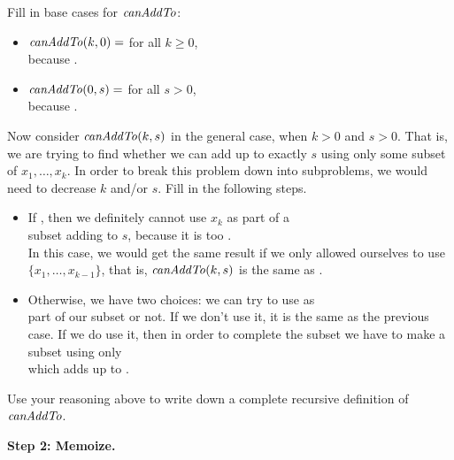 \documentclass{tufte-handout}
\begin{document}
\begin{questions}
  \item Fill in base cases for $\mathit{canAddTo}$:
    \begin{itemize}
    \item $\mathit{canAddTo}(k,0) = $ \blank for all $k \geq 0$, \\ because
      \blank.
    \item $\mathit{canAddTo}(0,s) = $ \blank for all $s > 0$, \\ because \blank.
    \end{itemize}
  \item Now consider $\mathit{canAddTo}(k,s)$ in the general case, when
    $k > 0$ and $s > 0$.  That is, we are trying to find whether we
    can add up to exactly $s$ using only some subset of
    $x_1, \dots, x_k$.  In order to break this problem down into
    subproblems, we would need to decrease $k$ and/or $s$.  Fill in
    the following steps.
    \begin{itemize}
    \item If \blank, then we definitely cannot use $x_k$ as part of a \\
      subset adding to $s$, because it is too \blank.  \\ In this
      case, we would get the same result if we only allowed ourselves
      to use $\{x_1, \dots, x_{k-1}\}$, that is, $\mathit{canAddTo}(k,s)$ is the
      same as \blank.
    \item Otherwise, we have two choices: we can try to use
      \blank as \\ part of our subset or not.  If we don't use it, it
      is the same as the previous case.  If we do use it, then in
      order to complete the subset we have to make a subset
      using only \blank \\ which adds up to \blank.
    \end{itemize}
  \item Use your reasoning above to write down a complete recursive
    definition of $\mathit{canAddTo}$.
\end{questions}

\pause
\noindent
\textbf{Step 2: Memoize.}
\end{document}
